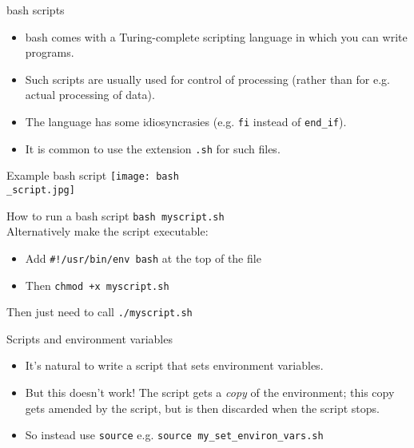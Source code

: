 \documentclass[dvipsnames]{beamer}
\newcommand{\command}[1]{\colorbox{light-gray}{\texttt{#1}}}
\newcommand{\filename}[1]{\colorbox{light-green}{\texttt{#1}}}
\begin{document}
\begin{frame}{bash scripts}
  \begin{itemize}
  \item bash comes with a Turing-complete scripting language in which you can write programs.
  \item Such scripts are usually used for control of processing (rather than for e.g. actual processing of data).
  \item The language has some idiosyncrasies (e.g. \command{fi} instead of \command{end\_if}).
  \item It is common to use the extension \filename{.sh} for such files.
  \end{itemize}
\end{frame}


\begin{frame}{Example bash script}
  \texttt{[image: bash\\\_script.jpg]}
\end{frame}


\begin{frame}{How to run a bash script}
    \command{bash myscript.sh} \\
  \vspace{1cm}
  Alternatively make the script executable:
  \begin{itemize}
  \item Add \command{\#!/usr/bin/env bash} at the top of the file
   \item Then \command{chmod +x myscript.sh}
     \end{itemize}
     Then just need to call \command{./myscript.sh}
\end{frame}


\begin{frame}{Scripts and environment variables}
\begin{itemize}
\item It's natural to write a script that sets environment variables.
\item But this doesn't work! The script gets a \textit{copy} of the environment; this copy gets amended by the script, but is then discarded when the script stops.
\item So instead use \command{source} e.g. \command{source my\_set\_environ\_vars.sh}
\end{itemize}
\end{frame}
\end{document}
